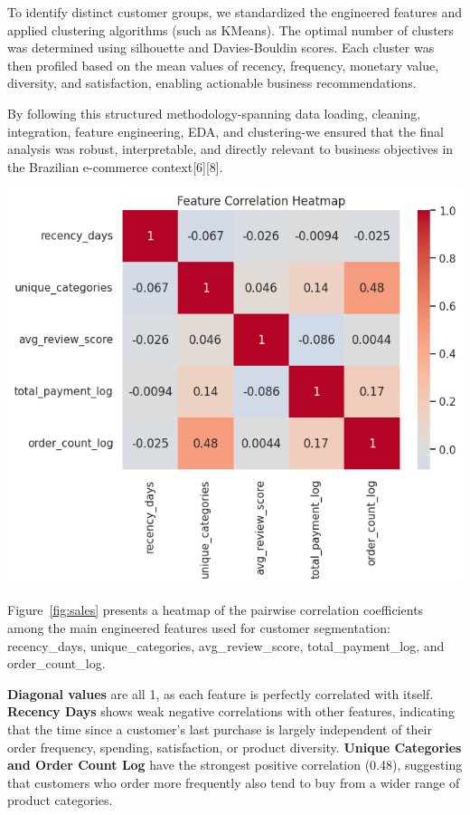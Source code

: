 \documentclass[a4paper]{article}
\begin{document}
\begin{multicols}{2}
To identify distinct customer groups, we standardized the engineered features and applied clustering algorithms (such as KMeans). The optimal number of clusters was determined using silhouette and Davies-Bouldin scores. Each cluster was then profiled based on the mean values of recency, frequency, monetary value, diversity, and satisfaction, enabling actionable business recommendations.

By following this structured methodology-spanning data loading, cleaning, integration, feature engineering, EDA, and clustering-we ensured that the final analysis was robust, interpretable, and directly relevant to business objectives in the Brazilian e-commerce context[6][8].


\noindent
\begin{minipage}{\columnwidth}
\centering
\includegraphics[width=1\textwidth]{Feature-Correlation-Heatmap.png}
\label{fig:sales} 
\end{minipage}

Figure~\ref{fig:sales} presents a heatmap of the pairwise correlation coefficients among the main engineered features used for customer segmentation: recency\_days, unique\_categories, avg\_review\_score, total\_payment\_log, and order\_count\_log.

\textbf{Diagonal values} are all 1, as each feature is perfectly correlated with itself.
\textbf{Recency Days} shows weak negative correlations with other features, indicating that the time since a customer’s last purchase is largely independent of their order frequency, spending, satisfaction, or product diversity.
\textbf{Unique Categories and Order Count Log} have the strongest positive correlation (0.48), suggesting that customers who order more frequently also tend to buy from a wider range of product categories.


\end{multicols}
\end{document}
